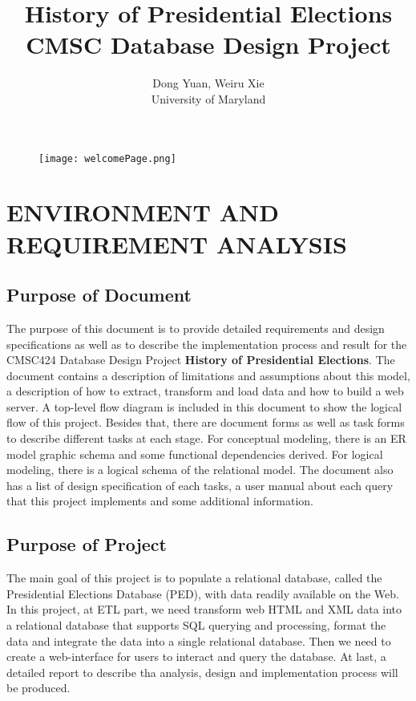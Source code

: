 \documentclass{article}
\begin{document}
\begin{figure}
\centering
\texttt{[image: welcomePage.png]}
\end{figure}

\title{ 
History of Presidential Elections \\ 
CMSC Database Design Project\\
}
\author{
Dong Yuan, Weiru Xie\\
University of Maryland
}
\date{}


\maketitle


\newpage
\tableofcontents
\newpage


\section{ENVIRONMENT AND REQUIREMENT ANALYSIS}
\subsection{Purpose of Document}
The purpose of this document is to provide detailed requirements and design specifications as well as to describe the implementation process and result for the CMSC424 Database Design Project \textbf{History of Presidential Elections}. The document contains a description of limitations and assumptions about this model, a description of how to extract, transform and load data and how to build a web server. A top-level flow diagram is included in this document to show the logical flow of this project. Besides that, there are document forms as well as task forms to describe different tasks at each stage. For conceptual modeling, there is an ER model graphic schema and some functional dependencies derived. For logical modeling, there is a logical schema of the relational model. The document also has a list of design specification of each tasks, a user manual about each query that this project implements and some additional information.

\subsection{Purpose of Project}
The main goal of this project is to populate a relational database, called the Presidential Elections Database (PED), with data readily available on the Web. In this project, at ETL part, we need transform web HTML and XML data into a relational database that supports SQL querying and processing, format the data and integrate the data into a single relational database. Then we need to create a web-interface for users to interact and query the database. At last, a detailed report to describe tha analysis, design and implementation process will be produced.
\end{document}
